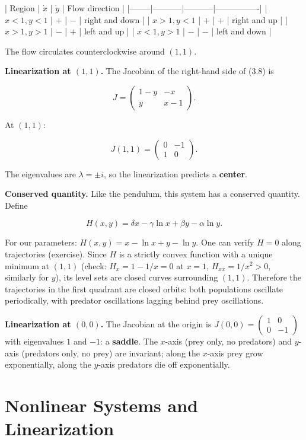 | Region | $\dot{x}$ | $\dot{y}$ | Flow direction |
|--------|-----------|-----------|----------------|
| $x < 1, y < 1$ | $+$ | $-$ | right and down |
| $x > 1, y < 1$ | $+$ | $+$ | right and up |
| $x > 1, y > 1$ | $-$ | $+$ | left and up |
| $x < 1, y > 1$ | $-$ | $-$ | left and down |

The flow circulates counterclockwise around $(1,1)$.

\textbf{Linearization at $(1,1)$.} The Jacobian of the right-hand side of (3.8) is

\[
J = \begin{pmatrix} 1 - y & -x \\ y & x - 1 \end{pmatrix}.
\]

At $(1,1)$:

\[
J(1,1) = \begin{pmatrix} 0 & -1 \\ 1 & 0 \end{pmatrix}.
\]

The eigenvalues are $\lambda = \pm i$, so the linearization predicts a \textbf{center}.

\textbf{Conserved quantity.} Like the pendulum, this system has a conserved quantity. Define

\[
H(x, y) = \delta x - \gamma \ln x + \beta y - \alpha \ln y.
\]

For our parameters: $H(x,y) = x - \ln x + y - \ln y$. One can verify $\dot{H} = 0$ along trajectories (exercise). Since $H$ is a strictly convex function with a unique minimum at $(1,1)$ (check: $H_x = 1 - 1/x = 0$ at $x=1$, $H_{xx} = 1/x^2 > 0$, similarly for $y$), its level sets are closed curves surrounding $(1,1)$. Therefore the trajectories in the first quadrant are closed orbits: both populations oscillate periodically, with predator oscillations lagging behind prey oscillations.

\textbf{Linearization at $(0,0)$.} The Jacobian at the origin is $J(0,0) = \begin{pmatrix} 1 & 0 \\ 0 & -1 \end{pmatrix}$ with eigenvalues $1$ and $-1$: a \textbf{saddle}. The $x$-axis (prey only, no predators) and $y$-axis (predators only, no prey) are invariant; along the $x$-axis prey grow exponentially, along the $y$-axis predators die off exponentially.


\bigskip


\section{Nonlinear Systems and Linearization}\label{sec:3.5}

